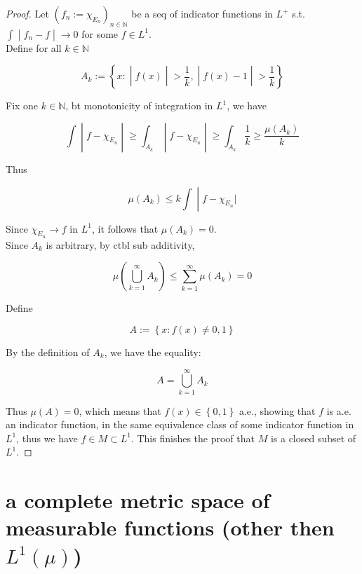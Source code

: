 \documentclass{qlnotes-export}
\begin{document}
\begin{proof}

Let \((f_{n} := \chi_{E_{n}})_{n \in {\mathbb{N}}}\) be a seq of indicator functions in \(L^{+}\) s.t. \(\left. \int \middle| f_{n} - f \middle| \rightarrow 0 \right.\) for some \(f \in L^{1}\).\\
Define for all \(k \in {\mathbb{N}}\)

\[A_{k} := \left\{ x: \middle| f(x) \middle| > \frac{1}{k}, \middle| f(x) - 1 \middle| > \frac{1}{k} \right\}\]

Fix one \(k \in {\mathbb{N}}\), bt monotonicity of integration in \(L^{1}\), we have

\[\left. \int \middle| f - \chi_{E_{n}} \middle| \geq \int_{A_{k}} \middle| f - \chi_{E_{n}} \middle| \geq \int_{A_{k}}\frac{1}{k} \geq \frac{\mu(A_{k})}{k} \right.\]

Thus

\[\left. \mu(A_{k}) \leq k\int \middle| f - \chi_{E_{n}}| \right.\]

Since \(\chi_{E_{n}}\rightarrow f\) in \(L^{1}\), it follows that \(\mu(A_{k}) = 0\).\\
Since \(A_{k}\) is arbitrary, by ctbl sub additivity,

\[\mu(\bigcup\limits_{k = 1}^{\infty}A_{k}) \leq \sum\limits_{k = 1}^{\infty}\mu(A_{k}) = 0\]

Define

\[A := \left\{ {x:f(x) \neq 0,1} \right\}\]

By the definition of \(A_{k}\), we have the equality:

\[A = \bigcup\limits_{k = 1}^{\infty}A_{k}\]

Thus \(\mu(A) = 0\), which means that \(f(x) \in \left\{ {0,1} \right\}\) a.e., showing that \(f\) is a.e. an indicator function, in the same equivalence class of some indicator function in \(L^{1}\), thus we have \(f \in M \subset L^{1}\). This finishes the proof that \(M\) is a closed subset of \(L^{1}\).

\end{proof}

\section{\texorpdfstring{a complete metric space of measurable functions (other then \(L^{1}(\mu)\))}{a complete metric space of measurable functions (other then L\^{}\{1\}(\textbackslash mu))}}\label{a-complete-metric-space-of-measurable-functions-other-then-l1mu}
\end{document}
